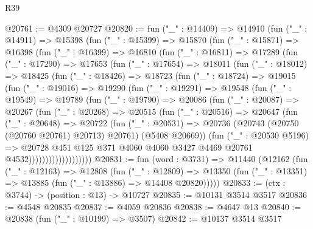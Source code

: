 \begin{lexlean}{R39}
\begin{coremodule}
@20761 := @4309 @20727
@20820 := fun ("_" : @14409) =>
  @14910
    (fun ("_" : @14911) =>
    @15398
      (fun ("_" : @15399) =>
      @15870
        (fun ("_" : @15871) =>
        @16398
          (fun ("_" : @16399) =>
          @16810
            (fun ("_" : @16811) =>
            @17289
              (fun ("_" : @17290) =>
              @17653
                (fun ("_" : @17654) =>
                @18011
                  (fun ("_" : @18012) =>
                  @18425
                    (fun ("_" : @18426) =>
                    @18723
                      (fun ("_" : @18724) =>
                      @19015
                        (fun ("_" : @19016) =>
                        @19290
                          (fun ("_" : @19291) =>
                          @19548
                            (fun ("_" : @19549) =>
                            @19789
                              (fun ("_" : @19790) =>
                              @20086
                                (fun ("_" : @20087) =>
                                @20267
                                  (fun ("_" : @20268) =>
                                  @20515
                                    (fun ("_" : @20516) =>
                                    @20647
                                      (fun ("_" : @20648) =>
                                      @20722
                                        (fun ("_" : @20531) =>
                                        @20736
                                          (@20743 (@20750 (@20760 @20761) @20713) @20761)
                                          (@5408 @20669))
                                        (fun ("_" : @20530 @5196) =>
                                        @20728
                                          @451
                                          @125
                                          @371
                                          @4060
                                          @4060
                                          @3427
                                          @4469
                                          @20761
                                          @4532)))))))))))))))))))
@20831 := fun (word : @3731) =>
  @11440
    (@12162
      (fun ("_" : @12163) =>
      @12808
        (fun ("_" : @12809) =>
        @13350 (fun ("_" : @13351) => @13885 (fun ("_" : @13886) => @14408 @20820)))))
@20833 := (ctx : @3744) -> (position : @13) -> @10727
@20835 := @10131 @3514 @3517
@20836 := @4548 @20835
@20837 := @4059 @20836
@20838 := @4647 @13
@20840 := @20838 (fun ("_" : @10199) => @3507)
@20842 := @10137 @3514 @3517

\end{coremodule}
\end{lexlean}
